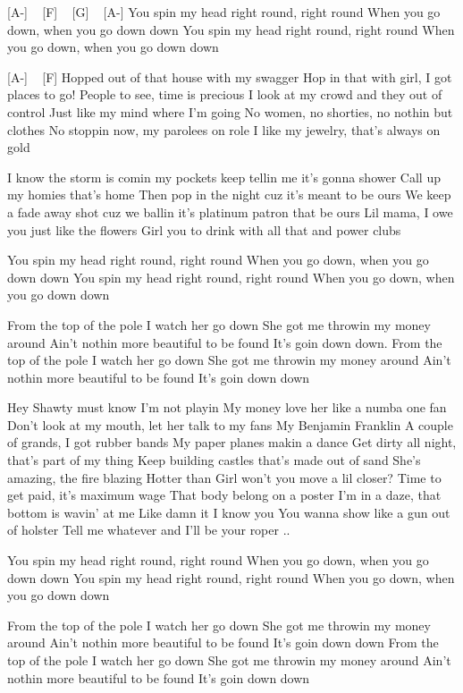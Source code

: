 
[A-] ~ [F] ~ [G] ~ [A-]
You spin my head right round, right round
When you go down, when you go down down
You spin my head right round, right round
When you go down, when you go down down

[A-] ~ [F]
Hopped out of that house with my swagger
Hop in that with girl, I got places to go!
People to see, time is precious
I look at my crowd and they out of control
Just like my mind where I’m going
No women, no shorties, no nothin but clothes
No stoppin now, my parolees on role
I like my jewelry, that’s always on gold

I know the storm is comin
my pockets keep tellin me it’s gonna shower
Call up my homies that’s home
Then pop in the night cuz it’s meant to be ours
We keep a fade away shot cuz we ballin
it’s platinum patron that be ours
Lil mama, I owe you just like the flowers
Girl you to drink with all that and power clubs

You spin my head right round, right round
When you go down, when you go down down
You spin my head right round, right round
When you go down, when you go down down

From the top of the pole I watch her go down
She got me throwin my money around
Ain’t nothin more beautiful to be found
It’s goin down down.
From the top of the pole I watch her go down
She got me throwin my money around
Ain’t nothin more beautiful to be found
It’s goin down down

Hey
Shawty must know I’m not playin
My money love her like a numba one fan
Don’t look at my mouth, let her talk to my fans
My Benjamin Franklin
A couple of grands, I got rubber bands
My paper planes makin a dance
Get dirty all night, that’s part of my thing
Keep building castles that’s made out of sand
She’s amazing, the fire blazing
Hotter than
Girl won’t you move a lil closer?
Time to get paid, it’s maximum wage
That body belong on a poster
I’m in a daze, that bottom is wavin’ at me
Like damn it I know you
You wanna show like a gun out of holster
Tell me whatever and I’ll be your roper ..

You spin my head right round, right round
When you go down, when you go down down
You spin my head right round, right round
When you go down, when you go down down

From the top of the pole I watch her go down
She got me throwin my money around
Ain’t nothin more beautiful to be found
It’s goin down down
From the top of the pole I watch her go down
She got me throwin my money around
Ain’t nothin more beautiful to be found
It’s goin down down


